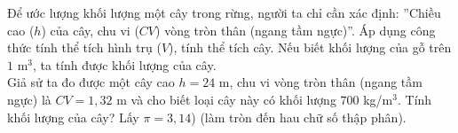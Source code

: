 \begin{bt}%
	Để ước lượng khối lượng một cây trong rừng, người ta chỉ cần xác định: ”Chiều cao ($h$) của cây, chu vi ($CV$) vòng tròn thân (ngang tầm ngực)”. Áp dụng công thức tính thể tích hình trụ ($V$), tính thể tích cây. Nếu biết khối lượng của gỗ trên $1$ m$^3$, ta tính được khối lượng của cây.\\
	Giả sử ta đo được một cây cao $h=24$ m, chu vi vòng tròn thân (ngang tầm ngực) là $CV=1{,}32$ m và cho biết loại cây này có khối lượng $700$ kg/m$^3$. Tính khối lượng của cây? Lấy $\pi=3{,}14$) (làm tròn đến hau chữ số thập phân).
	
\end{bt}

